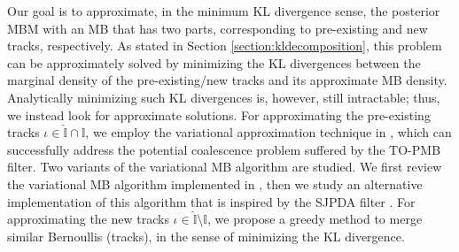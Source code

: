 \documentclass[journal]{IEEEtran}
\begin{document}
Our goal is to approximate, in the minimum KL divergence sense, the posterior MBM with an MB that has two parts, corresponding to pre-existing and new tracks, respectively. As stated in Section \ref{section:kldecomposition}, this problem can be approximately solved by minimizing the KL divergences between the marginal density of the pre-existing/new tracks and its approximate MB density. Analytically minimizing such KL divergences is, however, still intractable; thus, we instead look for approximate solutions. 
For approximating the pre-existing tracks $\iota\in\hat{\mathbb{I}}\cap\mathbb{I}$, we employ the variational approximation technique in \cite{variational}, which can successfully address the potential coalescence problem suffered by the TO-PMB filter. Two variants of the variational MB algorithm are studied. We first review the variational MB algorithm implemented in \cite{variational}, then we study an alternative implementation of this algorithm that is inspired by the SJPDA filter \cite{sjpda}. For approximating the new tracks $\iota\in\hat{\mathbb{I}}\setminus\mathbb{I}$, we propose a greedy method to merge similar Bernoullis (tracks), in the sense of minimizing the KL divergence. 


\end{document}
